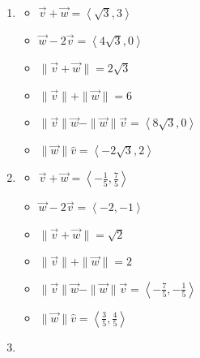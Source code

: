 \documentclass{ximera}
\begin{document}
\begin{enumerate}
\item  

 

\begin{itemize}

\item  $\overrightarrow{v} + \overrightarrow{w} = \left<\sqrt{3},3\right> $ 
\item  $\overrightarrow{w}  - 2\overrightarrow{v}  = \left<4\sqrt{3}, 0 \right>$ 


\item $\| \overrightarrow{v} + \overrightarrow{w} \| = 2\sqrt{3}$ 
\item  $\| \overrightarrow{v} \| + \| \overrightarrow{w}\| = 6$ 


\item $\| \overrightarrow{v} \| \overrightarrow{w} - \| \overrightarrow{w} \| \overrightarrow{v}  = \left<8\sqrt{3},0\right>$ 
\item $\|\overrightarrow{w}\| \hat{v}= \left<-2\sqrt{3}, 2 \right>$ 

\end{itemize}

 

\item  

 

\begin{itemize}

\item  $\overrightarrow{v} + \overrightarrow{w} = \left<-\frac{1}{5},\frac{7}{5}\right> $ 
\item  $\overrightarrow{w}  - 2\overrightarrow{v}  = \left<-2, -1 \right>$ 


\item $\| \overrightarrow{v} + \overrightarrow{w} \| = \sqrt{2}$ 
\item  $\| \overrightarrow{v} \| + \| \overrightarrow{w}\| = 2$ 

\item $\| \overrightarrow{v} \| \overrightarrow{w} - \| \overrightarrow{w} \| \overrightarrow{v}  = \left<-\frac{7}{5},-\frac{1}{5}\right>$ 
\item $\|\overrightarrow{w}\| \hat{v}= \left<\frac{3}{5}, \frac{4}{5} \right>$ 

\end{itemize}

 

\item  

 


\end{enumerate}
\end{document}
